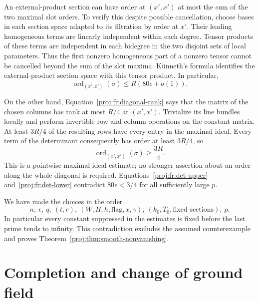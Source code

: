 \documentclass[11pt,letterpaper]{article}
\DeclareMathOperator{\ord}{ord}
\theoremstyle{definition}
\theoremstyle{remark}
\begin{document}
An external-product section can have order at \((x',x')\) at most
the sum of the two maximal slot orders. To verify this despite
possible cancellation, choose bases in each section space adapted to
its filtration by order at \(x'\). Their leading homogeneous terms
are linearly independent within each degree. Tensor products of
these terms are independent in each bidegree in the two disjoint
sets of local parameters. Thus the first nonzero homogeneous part
of a nonzero tensor cannot be cancelled beyond the sum of the slot
maxima. K\"unneth's formula identifies the external-product section
space with this tensor product. In particular,
\begin{equation}
\label{proj:fr:det-upper}
 \ord_{(x',x')}(\sigma)\leq R(80\epsilon+o(1)).
\end{equation}

On the other hand, Equation~\eqref{proj:fr:diagonal-rank} says that the
matrix of the chosen columns has rank at most \(R/4\) at \((x',x')\).
Trivialize its line bundles locally and perform invertible row and
column operations on the constant matrix. At least \(3R/4\) of the
resulting rows have every entry in the maximal ideal. Every term
of the determinant consequently has order at least \(3R/4\), so
\begin{equation}
\label{proj:fr:det-lower}
 \ord_{(x',x')}(\sigma)\geq\frac{3R}{4}.
\end{equation}
This is a pointwise maximal-ideal estimate; no stronger assertion
about an order along the whole diagonal is required.
Equations~\eqref{proj:fr:det-upper} and~\eqref{proj:fr:det-lower} contradict
\(80\epsilon<3/4\) for all sufficiently large \(p\).

We have made the choices in the order
\[
 n,\ \epsilon,\ q,\ (t,r),\
 (W,H,h,\text{flag},x,\gamma),\
 (k_0,T_0,\text{fixed sections}),\ p.
\]
In particular every constant suppressed in the estimates is fixed
before the last prime tends to infinity. This contradiction excludes
the assumed counterexample and proves
Theorem~\ref{proj:thm:smooth-nonvanishing}.

\section{Completion and change of ground field}\label{proj:sec:completion}
\end{document}
